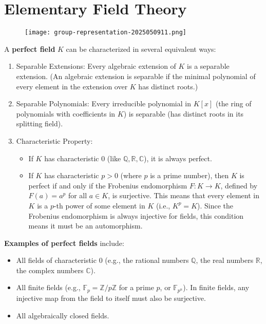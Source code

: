 \section{Elementary Field Theory}

\begin{exercise}
\begin{figure}[H]
\centering
\texttt{[image: group-representation-2025050911.png]}
\label{}
\end{figure}
\end{exercise}
A \textbf{perfect field} $K$ can be characterized in several equivalent ways:

\begin{enumerate}
	\item Separable Extensions: Every algebraic extension of $K$ is a separable extension. (An algebraic extension is separable if the minimal polynomial of every element in the extension over $K$ has distinct roots.)
	\item Separable Polynomials: Every irreducible polynomial in $K[x]$ (the ring of polynomials with coefficients in $K$) is separable (has distinct roots in its splitting field).
	\item Characteristic Property:
	\begin{itemize}
		\item If $K$ has characteristic 0 (like $\mathbb{Q}, \mathbb{R}, \mathbb{C}$), it is always perfect.
		\item If $K$ has characteristic $p>0$ (where $p$ is a prime number), then $K$ is perfect if and only if the Frobenius endomorphism $F: K \rightarrow K$, defined by $F(a)=a^p$ for all $a \in K$, is surjective. This means that every element in $K$ is a $p$-th power of some element in $K$ (i.e., $K^p=K$). Since the Frobenius endomorphism is always injective for fields, this condition means it must be an automorphism.
	\end{itemize}
\end{enumerate}

\textbf{Examples of perfect fields} include:

\begin{itemize}
	\item All fields of characteristic 0 (e.g., the rational numbers $\mathbb{Q}$, the real numbers $\mathbb{R}$, the complex numbers $\mathbb{C}$).
	\item All finite fields (e.g., $\mathbb{F}_p=\mathbb{Z} / p \mathbb{Z}$ for a prime $p$, or $\mathbb{F}_{p^n}$). In finite fields, any injective map from the field to itself must also be surjective.
	\item All algebraically closed fields.
\end{itemize}

